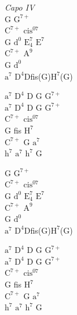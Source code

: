 \begin{chordw}
    \textit{Capo IV}\\
    G $\mathrm{G^{7+}}$\\
    $\mathrm{C^{7+}}$ $\mathrm{cis^{07}}$\\
    G $\mathrm{d^0}$ $\mathrm{E_4^7}$ $\mathrm{E^7}$\\
    $\mathrm{C^{7+}}$ $\mathrm{A^9}$\\
    G $\mathrm{d^0}$\\
    $\mathrm{a^{7}}$ $\mathrm{D^{4}}$Dfis(G)$\mathrm{H^7}$(G)

    $\mathrm{a^7}$ $\mathrm{D^4}$ D G $\mathrm{G^{7+}}$\\
    $\mathrm{a^7}$ $\mathrm{D^4}$ D G $\mathrm{G^{7+}}$\\
    $\mathrm{C^{7+}}$ $\mathrm{cis^{07}}$\\
    G fis $\mathrm{H^7}$\\
    $\mathrm{C^{7+}}$ G $\mathrm{a^{7}}$\\
    $\mathrm{h^{7}}$ $\mathrm{a^{7}}$ $\mathrm{h^{7}}$ G

    G $\mathrm{G^{7+}}$\\
    $\mathrm{C^{7+}}$ $\mathrm{cis^{07}}$\\
    G $\mathrm{d^0}$ $\mathrm{E_4^7}$ $\mathrm{E^7}$\\
    $\mathrm{C^{7+}}$ $\mathrm{A^9}$\\
    G $\mathrm{d^0}$\\
    $\mathrm{a^{7}}$ $\mathrm{D^{4}}$Dfis(G)$\mathrm{H^7}$(G)

    $\mathrm{a^7}$ $\mathrm{D^4}$ D G $\mathrm{G^{7+}}$\\
    $\mathrm{a^7}$ $\mathrm{D^4}$ D G $\mathrm{G^{7+}}$\\
    $\mathrm{C^{7+}}$ $\mathrm{cis^{07}}$\\
    G fis $\mathrm{H^7}$\\
    $\mathrm{C^{7+}}$ G $\mathrm{a^{7}}$\\
    $\mathrm{h^{7}}$ $\mathrm{a^{7}}$ $\mathrm{h^{7}}$ G
\end{chordw}
